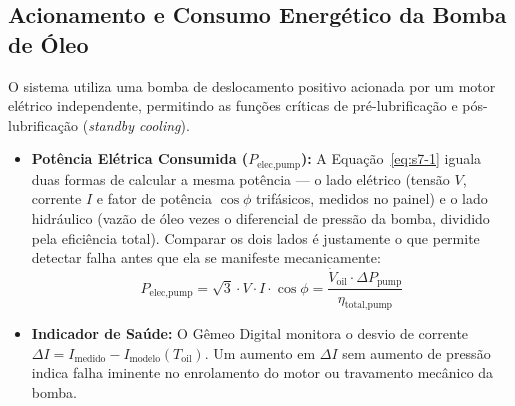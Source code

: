 \documentclass[12pt,a4paper]{article}
\numberwithin{equation}{section}
\numberwithin{table}{section}
\numberwithin{figure}{section}
\begin{document}
	\subsection{\textbf{Acionamento e Consumo Energético da Bomba de Óleo}}
	O sistema utiliza uma bomba de deslocamento positivo acionada por um motor elétrico independente, permitindo as funções críticas de pré-lubrificação e pós-lubrificação (\textit{standby cooling}).
	\begin{itemize}
		\item \textbf{Potência Elétrica Consumida ($P_{\text{elec,pump}}$):} A Equação~\eqref{eq:s7-1} iguala duas formas de calcular a mesma potência — o lado elétrico (tensão $V$, corrente $I$ e fator de potência $\cos\phi$ trifásicos, medidos no painel) e o lado hidráulico (vazão de óleo vezes o diferencial de pressão da bomba, dividido pela eficiência total). Comparar os dois lados é justamente o que permite detectar falha antes que ela se manifeste mecanicamente:
		\begin{equation}\label{eq:s7-1}
 P_{\text{elec,pump}} = \sqrt{3} \cdot V \cdot I \cdot \cos \phi = \frac{\dot{V}_{\text{oil}} \cdot \Delta P_{\text{pump}}}{\eta_{\text{total,pump}}}
\end{equation}
		\item \textbf{Indicador de Saúde:} O Gêmeo Digital monitora o desvio de corrente $\Delta I = I_{\text{medido}} - I_{\text{modelo}}(T_{\text{oil}})$. Um aumento em $\Delta I$ sem aumento de pressão indica falha iminente no enrolamento do motor ou travamento mecânico da bomba.
	\end{itemize}
	
\end{document}
